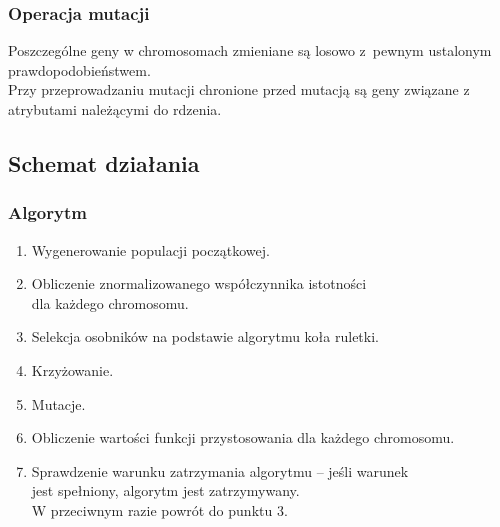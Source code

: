 \documentclass[10pt]{beamer}
\begin{document}
\begin{frame}
\frametitle{Operacja mutacji}
\begin{spacing}{1.5}
\begin{flushleft}
Poszczególne geny w chromosomach zmieniane są losowo z~pewnym ustalonym prawdopodobieństwem.\\
Przy przeprowadzaniu mutacji chronione przed mutacją są geny związane 
z atrybutami należącymi do rdzenia.
\end{flushleft}
\end{spacing}

\end{frame}

\subsection{Schemat działania}
\begin{frame}
\frametitle{Algorytm}
\begin{spacing}{1.3}
\begin{flushleft}
\begin{enumerate}[1.]
\item Wygenerowanie populacji początkowej.
\item Obliczenie znormalizowanego współczynnika istotności\\
dla każdego chromosomu.
\item Selekcja osobników na podstawie algorytmu koła ruletki.
\item Krzyżowanie.
\item Mutacje.
\item Obliczenie wartości funkcji przystosowania dla każdego chromosomu.
\item Sprawdzenie warunku zatrzymania algorytmu -- jeśli warunek\\
jest spełniony, algorytm jest zatrzymywany.\\
W przeciwnym razie powrót do punktu 3.
\end{enumerate}
\end{flushleft}
\end{spacing}

\end{frame}
\end{document}
